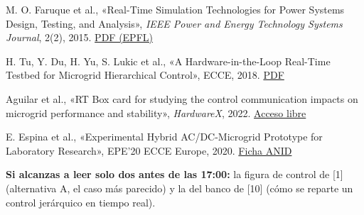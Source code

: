 \documentclass[10pt,a4paper]{article}
\begin{document}
\begin{enumerate}[label={[\arabic*]},leftmargin=*,itemsep=2pt]
  \item M. O. Faruque et al., «Real-Time Simulation Technologies for Power Systems Design, Testing, and Analysis», \emph{IEEE Power and Energy Technology Systems Journal}, 2(2), 2015. \href{https://infoscience.epfl.ch/record/210998/files/07138557.pdf?version=1}{PDF (EPFL)}
  \item H. Tu, Y. Du, H. Yu, S. Lukic et al., «A Hardware-in-the-Loop Real-Time Testbed for Microgrid Hierarchical Control», ECCE, 2018. \href{https://www.freedm.ncsu.edu/wp-content/uploads/2018/10/ECCE-2018-HIL-Testbed-for-Microgrid-Control-Tu-Du-Lu-Lukic.pdf}{PDF}
  \item Aguilar et al., «RT Box card for studying the control communication impacts on microgrid performance and stability», \emph{HardwareX}, 2022. \href{https://www.ncbi.nlm.nih.gov/pmc/articles/PMC9184748/}{Acceso libre}
  \item E. Espina et al., «Experimental Hybrid AC/DC-Microgrid Prototype for Laboratory Research», EPE'20 ECCE Europe, 2020. \href{https://investigadores.anid.cl//en/public_search/work?id=822381}{Ficha ANID}
\end{enumerate}
\textbf{Si alcanzas a leer solo dos antes de las 17:00:} la figura de control de [1] (alternativa A, el caso más parecido) y la del banco de [10] (cómo se reparte un control jerárquico en tiempo real).
\end{document}
